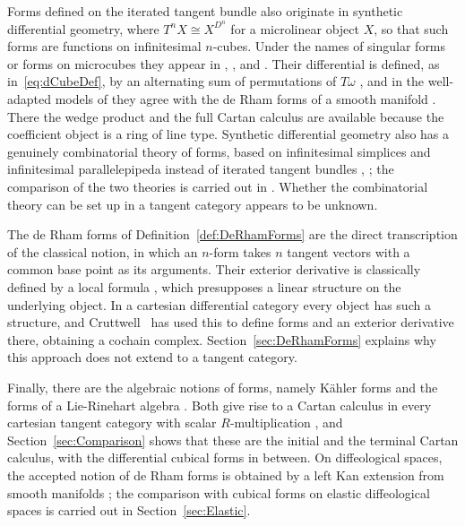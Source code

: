 \documentclass[12pt,reqno, a4paper]{amsart}
\numberwithin{equation}{section}
\theoremstyle{plain}
\theoremstyle{definition}
\theoremstyle{remark}
\begin{document}
Forms defined on the iterated tangent bundle also originate in synthetic differential geometry, where $T^n X \cong X^{D^n}$ for a microlinear object $X$, so that such forms are functions on infinitesimal $n$-cubes. Under the names of singular forms or forms on microcubes they appear in \cite[\S I.14.2]{Kock:2006}, \cite[Ch.~IV, \S 1]{MoerdijkReyes:1991}, and \cite[\S 4.1.1]{Lavendhomme:1996}. Their differential is defined, as in~\eqref{eq:dCubeDef}, by an alternating sum of permutations of $T\omega$ \cite[\S 4.2.3]{Lavendhomme:1996}, and in the well-adapted models of \cite{MoerdijkReyes:1991} they agree with the de Rham forms of a smooth manifold \cite[Ch.~IV, Prop.~3.7]{MoerdijkReyes:1991}. There the wedge product and the full Cartan calculus are available because the coefficient object is a ring of line type. Synthetic differential geometry also has a genuinely combinatorial theory of forms, based on infinitesimal simplices and infinitesimal parallelepipeda instead of iterated tangent bundles \cite[\S 3.1, \S 3.2]{Kock:2010}, \cite{Kock:2000, MoerdijkReyes:1986}; the comparison of the two theories is carried out in \cite[\S 4.7]{Kock:2010}. Whether the combinatorial theory can be set up in a tangent category appears to be unknown.

The de Rham forms of Definition~\ref{def:DeRhamForms} are the direct transcription of the classical notion, in which an $n$-form takes $n$ tangent vectors with a common base point as its arguments. Their exterior derivative is classically defined by a local formula \cite[7.8]{KolarMichorSlovak:1993}, which presupposes a linear structure on the underlying object. In a cartesian differential category every object has such a structure, and Cruttwell~\cite{Cruttwell:2013} has used this to define forms and an exterior derivative there, obtaining a cochain complex. Section~\ref{sec:DeRhamForms} explains why this approach does not extend to a tangent category.

Finally, there are the algebraic notions of forms, namely K\"ahler forms and the forms of a Lie-Rinehart algebra \cite{Rinehart:1963, Huebschmann:1998}. Both give rise to a Cartan calculus in every cartesian tangent category with scalar $R$-multiplication \cite{AintablianBlohmann:2026}, and Section~\ref{sec:Comparison} shows that these are the initial and the terminal Cartan calculus, with the differential cubical forms in between. On diffeological spaces, the accepted notion of de Rham forms is obtained by a left Kan extension from smooth manifolds \cite[\S 6.28]{IglesiasZemmour:2013}; the comparison with cubical forms on elastic diffeological spaces is carried out in Section~\ref{sec:Elastic}.
\end{document}
